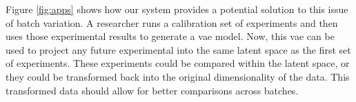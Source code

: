 Figure \ref{fig:apps} shows how our system provides a potential solution to this issue of batch variation.
A researcher runs a calibration set of experiments and then uses those experimental results to generate a \gls{vae} model.
Now, this \gls{vae} can be used to project any future experimental into the same latent space as the first set of experiments.
These experiments could be compared within the latent space, or they could be transformed back into the original dimensionality of the data.
This transformed data should allow for better comparisons across batches.

